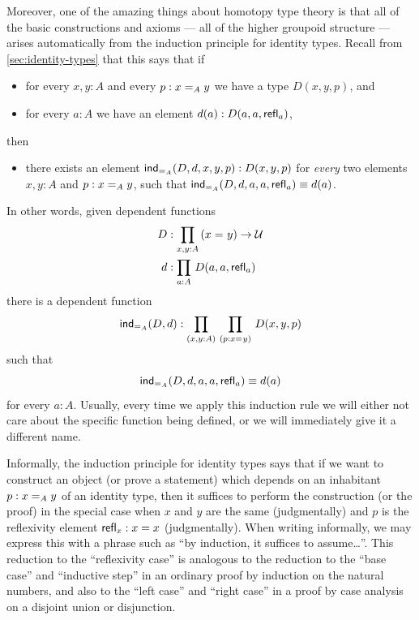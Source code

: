 Moreover, one of the amazing things about homotopy type theory is that all of the basic constructions and axioms --- all of the
higher groupoid structure --- arises automatically from the induction
principle for identity types.
Recall from \cref{sec:identity-types} that this says that if
\begin{itemize}
\item for every $x,y:A$ and every $p:\id[A]xy$ we have a type $D(x,y,p)$, and
\item for every $a:A$ we have an element $d(a):D(a,a,\refl a)$,
\end{itemize}
then
\begin{itemize}
\item there exists an element $\indid{A}(D,d,x,y,p):D(x,y,p)$ for \emph{every} two elements $x,y:A$ and $p:\id[A]xy$, such that $\indid{A}(D,d,a,a,\refl a) \jdeq d(a)$.
\end{itemize}
In other words, given dependent functions
\begin{align*}
D & :\prd{x,y:A} (\id{x}{y}) \to \type\\
d & :\prd{a:A} D(a,a,\refl{a})
\end{align*}
there is a dependent function
\[\indid{A}(D,d):\prd{x,y:A}{p:\id{x}{y}} D(x,y,p)\]
such that
\begin{equation}\label{eq:Jconv}
\indid{A}(D,d,a,a,\refl{a})\jdeq d(a)
\end{equation}
for every $a:A$.
Usually, every time we apply this induction rule we will either not care about the specific function being defined, or we will immediately give it a different name.

Informally, the induction principle for identity types says that if we want to construct an object (or prove a statement) which depends on an inhabitant $p:\id[A]xy$ of an identity type, then it suffices to perform the construction (or the proof) in the special case when $x$ and $y$ are the same (judgmentally) and $p$ is the reflexivity element $\refl{x}:x=x$ (judgmentally).
When writing informally, we may express this with a phrase such as ``by induction, it suffices to assume\dots''.
This reduction to the ``reflexivity case'' is analogous to the reduction to the ``base case'' and ``inductive step'' in an ordinary proof by induction on the natural numbers, and also to the ``left case'' and ``right case'' in a proof by case analysis on a disjoint union or disjunction.%


